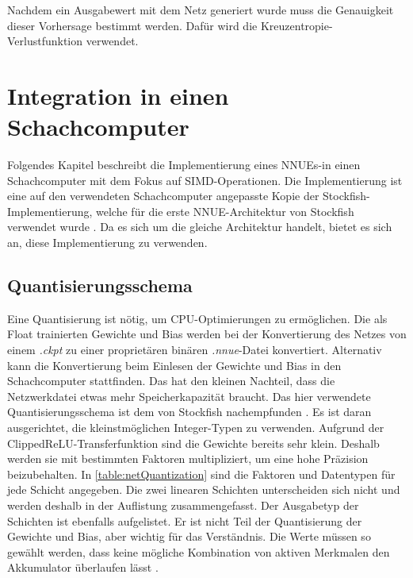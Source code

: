 Nachdem ein Ausgabewert mit dem Netz generiert wurde muss die Genauigkeit dieser Vorhersage bestimmt werden. Dafür wird die Kreuzentropie-Verlustfunktion verwendet.
\cite{Zeiler2012}



\section{Integration in einen Schachcomputer}
\label{chap:integration}

Folgendes Kapitel beschreibt die Implementierung eines \acp{NNUE}-in einen Schachcomputer mit dem Fokus auf \ac{SIMD}-Operationen. Die Implementierung ist eine auf den verwendeten Schachcomputer angepasste Kopie der Stockfish-Implementierung, welche für die erste \ac{NNUE}-Architektur von Stockfish verwendet wurde \cite{StockfishRepo}. Da es sich um die gleiche Architektur handelt, bietet es sich an, diese Implementierung zu verwenden.

\subsection{Quantisierungsschema}

Eine Quantisierung ist nötig, um CPU-Optimierungen zu ermöglichen. Die als Float trainierten Gewichte und Bias werden bei der Konvertierung des Netzes von einem \emph{.ckpt} zu einer proprietären binären \emph{.nnue}-Datei konvertiert. Alternativ kann die Konvertierung beim Einlesen der Gewichte und Bias in den Schachcomputer stattfinden. Das hat den kleinen Nachteil, dass die Netzwerkdatei etwas mehr Speicherkapazität braucht. Das hier verwendete Quantisierungsschema ist dem von Stockfish nachempfunden \cite{StockfishNNUE}. Es ist daran ausgerichtet, die kleinstmöglichen Integer-Typen zu verwenden. Aufgrund der Clipped\ac{ReLU}-Transferfunktion sind die Gewichte bereits sehr klein. Deshalb werden sie mit bestimmten Faktoren multipliziert, um eine hohe Präzision beizubehalten. In \autoref{table:netQuantization} sind die Faktoren und Datentypen für jede Schicht angegeben. Die zwei linearen Schichten unterscheiden sich nicht und werden deshalb in der Auflistung zusammengefasst. Der Ausgabetyp der Schichten ist ebenfalls aufgelistet. Er ist nicht Teil der Quantisierung der Gewichte und Bias, aber wichtig für das Verständnis. Die Werte müssen so gewählt werden, dass keine mögliche Kombination von aktiven Merkmalen den Akkumulator überlaufen lässt \cite{StockfishNNUE}.

